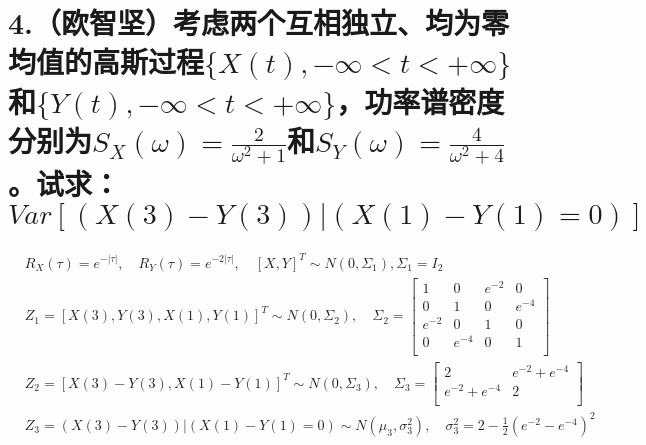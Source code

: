 \documentclass[UTF8]{ctexart}
\begin{document}
\section*{4.（欧智坚）考虑两个互相独立、均为零均值的高斯过程$\{X(t),-\infty<t<+\infty\}$和$\{Y(t),
    -\infty<t<+\infty\}$，功率谱密度分别为$S_X(\omega)=\frac{2}{\omega^2+1}$和$S_Y(\omega)=\frac{4}
    {\omega^2+4}$。试求：$Var[(X(3)-Y(3))\lvert (X(1)-Y(1)=0)]$}
\begin{equation*}
  \begin{aligned}
     & R_X(\tau)=e^{-\lvert\tau\rvert},\quad R_Y(\tau)=e^{-2\lvert\tau\rvert},\quad
    [X,Y]^T\sim N(0,\Sigma_1),\Sigma_1=I_2                                          \\
     & Z_1=[X(3),Y(3),X(1),Y(1)]^T\sim N(0,\Sigma_2),\quad\Sigma_2=
    \begin{bmatrix}
      1      & 0      & e^{-2} & 0      \\
      0      & 1      & 0      & e^{-4} \\
      e^{-2} & 0      & 1      & 0      \\
      0      & e^{-4} & 0      & 1      \\
    \end{bmatrix}                                                       \\
     & Z_2=[X(3)-Y(3),X(1)-Y(1)]^T\sim N(0,\Sigma_3),\quad\Sigma_3=
    \begin{bmatrix}
      2             & e^{-2}+e^{-4} \\
      e^{-2}+e^{-4} & 2             \\
    \end{bmatrix}                                                       \\
     & Z_3=(X(3)-Y(3))\lvert(X(1)-Y(1)=0)\sim N(\mu_3,\sigma_3^2),\quad
    \sigma_3^2=2-\frac{1}{2}(e^{-2}-e^{-4})^2                                       \\
  \end{aligned}
\end{equation*}
\end{document}
